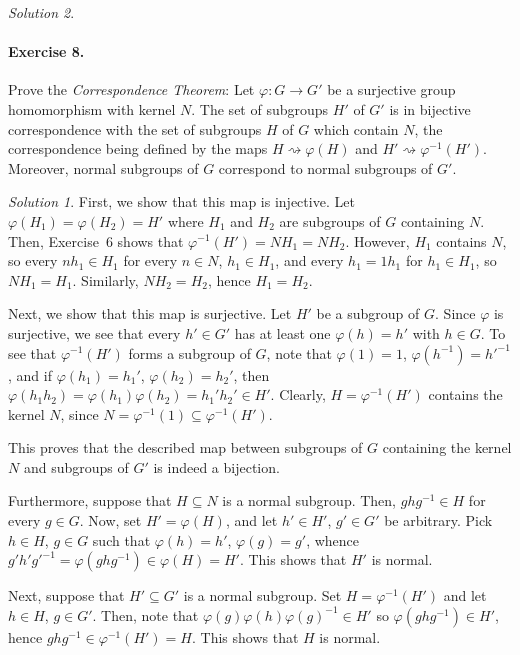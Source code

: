 \documentclass[11pt]{report}
\theoremstyle{remark}
\newtheorem*{solution}{Solution}
\begin{document}
\begin{solution}
    \paragraph{Exercise 8.} Prove the \textit{Correspondence Theorem}: Let
    $\varphi\colon G \to G'$ be a surjective group homomorphism with kernel $N$. The
    set of subgroups $H'$ of $G'$ is in bijective correspondence with the set of
    subgroups $H$ of $G$ which contain $N$, the correspondence being defined by the
    maps $H \rightsquigarrow \varphi(H)$ and $H' \rightsquigarrow \varphi^{-1}(H')$.
    Moreover, normal subgroups of $G$ correspond to normal subgroups of $G'$.
    \begin{solution}
        First, we show that this map is injective. Let $\varphi(H_1) = \varphi(H_2)
        = H'$ where $H_1$ and $H_2$ are subgroups of $G$ containing $N$. Then,
        Exercise~6 shows that $\varphi^{-1}(H') = NH_1 = NH_2$. However, $H_1$
        contains $N$, so every $nh_1 \in H_1$ for every $n \in N$, $h_1 \in H_1$,
        and every $h_1 = 1h_1$ for $h_1 \in H_1$, so $NH_1 = H_1$. Similarly, $NH_2
        = H_2$, hence $H_1 = H_2$.

        Next, we show that this map is surjective. Let $H'$ be a subgroup of $G$.
        Since $\varphi$ is surjective, we see that every $h' \in G'$ has at least one
        $\varphi(h) = h'$ with $h \in G$. To see that $\varphi^{-1}(H')$ forms
        a subgroup of $G$, note that $\varphi(1) = 1$, $\varphi(h^{-1}) =
        h'^{-1}$, and if $\varphi(h_1) = h_1'$, $\varphi(h_2) = h_2'$, then 
        $\varphi(h_1h_2) = \varphi(h_1)\varphi(h_2) = h_1'h_2' \in H'$. Clearly, $H
        = \varphi^{-1}(H')$ contains the kernel $N$, since $N = \varphi^{-1}(1)
        \subseteq \varphi^{-1}(H')$.

        This proves that the described map between subgroups of $G$ containing the
        kernel $N$ and subgroups of $G'$ is indeed a bijection.

        Furthermore, suppose that $H \subseteq N$ is a normal subgroup. Then,
        $ghg^{-1} \in H$ for every $g \in G$. Now, set $H' = \varphi(H)$, and let
        $h' \in H'$, $g' \in G'$ be arbitrary. Pick $h \in H$, $g \in G$ such that
        $\varphi(h) = h'$, $\varphi(g) = g'$, whence $g'h'g'^{-1} =
        \varphi(ghg^{-1}) \in \varphi(H) = H'$. This shows that $H'$ is normal.

        Next, suppose that $H' \subseteq G'$ is a normal subgroup. Set $H =
        \varphi^{-1}(H')$ and let $h \in H$, $g \in G'$. Then, note that
        $\varphi(g)\varphi(h)\varphi(g)^{-1} \in H'$ so $\varphi(ghg^{-1}) \in H'$,
        hence $ghg^{-1} \in \varphi^{-1}(H') = H$. This shows that $H$ is normal.
    \end{solution}


\end{solution}
\end{document}
